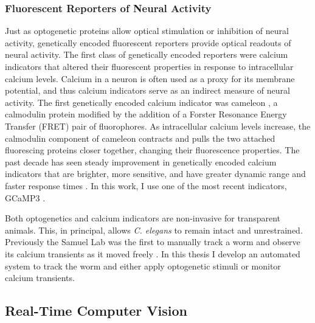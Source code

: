 \subsubsection{Fluorescent Reporters of Neural Activity}
Just as optogenetic proteins allow optical stimulation or inhibition of neural activity,  genetically encoded fluorescent reporters provide optical readouts of neural activity.  The first class of genetically encoded reporters were calcium indicators that altered their fluorescent properties in response to intracellular calcium levels. Calcium in a neuron is often used as a proxy for its membrane potential, and thus calcium indicators serve as an indirect measure of neural activity.   The first genetically encoded calcium indicator was cameleon \citep{miyawaki_fluorescent_1997}, a calmodulin protein modified by the addition of a Forster Resonance Energy Transfer (FRET) pair of fluorophores. As intracellular calcium levels increase, the calmodulin component of  cameleon contracts and pulls the two attached fluorescing proteins closer together, changing their fluorescence properties. The past decade has seen  steady improvement in genetically encoded calcium indicators that are brighter, more sensitive, and have greater dynamic range and faster response times \citep{miyawaki_innovations_2005,mank_genetically_2008,yamada_quantitative_2011}. In this work, I use one of the most recent indicators, GCaMP3 \citep{tian_imaging_2009}.
 

Both optogenetics and calcium indicators are non-invasive for transparent animals. This, in principal, allows \textit{C. elegans} to remain intact and unrestrained. Previously the Samuel Lab was the first to manually track a worm and observe its calcium transients as it moved freely \citep{clark_temporal_2007}. In this thesis I develop an automated system to track the worm and either apply optogenetic stimuli or monitor calcium transients.



\subsection{Real-Time Computer Vision}

